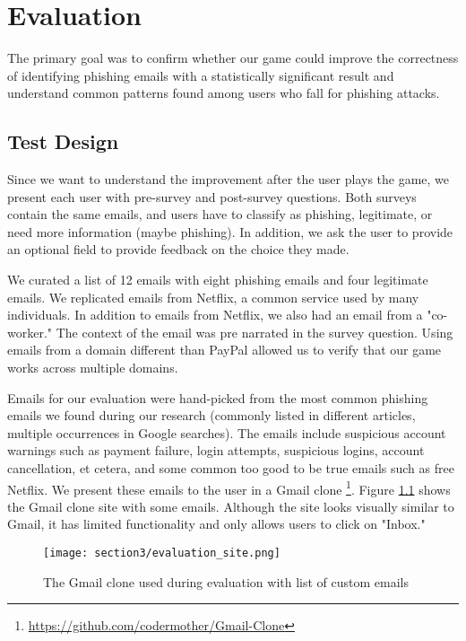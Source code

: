 



\chapter{Evaluation}

The primary goal was to confirm whether our game could improve the correctness of identifying phishing emails with a statistically significant result and understand common patterns found among users who fall for phishing attacks.

\section{Test Design}
Since we want to understand the improvement after the user plays the game, we present each user with pre-survey and post-survey questions. Both surveys contain the same emails, and users have to classify as phishing, legitimate, or need more information (maybe phishing). In addition, we ask the user to provide an optional field to provide feedback on the choice they made.

We curated a list of 12 emails with eight phishing emails and four legitimate emails. We replicated emails from Netflix, a common service used by many individuals. In addition to emails from Netflix, we also had an email from a "co-worker." The context of the email was pre narrated in the survey question. Using emails from a domain different than PayPal allowed us to verify that our game works across multiple domains.

Emails for our evaluation were hand-picked from the most common phishing emails we found during our research (commonly listed in different articles, multiple occurrences in Google searches). The emails include suspicious account warnings such as payment failure, login attempts, suspicious logins, account cancellation, et cetera, and some common too good to be true emails such as free Netflix. We present these emails to the user in a Gmail clone \footnote{\url{https://github.com/codermother/Gmail-Clone}}. Figure \ref{fig:evaluation_site} shows the Gmail clone site with some emails. Although the site looks visually similar to Gmail, it has limited functionality and only allows users to click on "Inbox."

\begin{figure}[!ht]
    \texttt{[image: section3/evaluation\_site.png]}
    \caption{The Gmail clone used during evaluation with list of custom emails}
    \label{fig:evaluation_site}
\end{figure}

